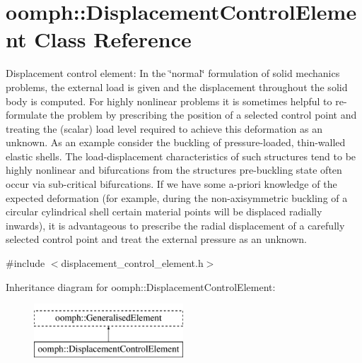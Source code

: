 \hypertarget{classoomph_1_1DisplacementControlElement}{}\section{oomph\+:\+:Displacement\+Control\+Element Class Reference}
\label{classoomph_1_1DisplacementControlElement}


Displacement control element\+: In the \char`\"{}normal\char`\"{} formulation of solid mechanics problems, the external load is given and the displacement throughout the solid body is computed. For highly nonlinear problems it is sometimes helpful to re-\/formulate the problem by prescribing the position of a selected control point and treating the (scalar) load level required to achieve this deformation as an unknown. As an example consider the buckling of pressure-\/loaded, thin-\/walled elastic shells. The load-\/displacement characteristics of such structures tend to be highly nonlinear and bifurcations from the structure\textquotesingle{}s pre-\/buckling state often occur via sub-\/critical bifurcations. If we have some a-\/priori knowledge of the expected deformation (for example, during the non-\/axisymmetric buckling of a circular cylindrical shell certain material points will be displaced radially inwards), it is advantageous to prescribe the radial displacement of a carefully selected control point and treat the external pressure as an unknown.  




{\ttfamily \#include $<$displacement\+\_\+control\+\_\+element.\+h$>$}

Inheritance diagram for oomph\+:\+:Displacement\+Control\+Element\+:\begin{figure}[H]
\begin{center}
\leavevmode
\includegraphics[height=2.000000cm]{classoomph_1_1DisplacementControlElement}
\end{center}
\end{figure}
